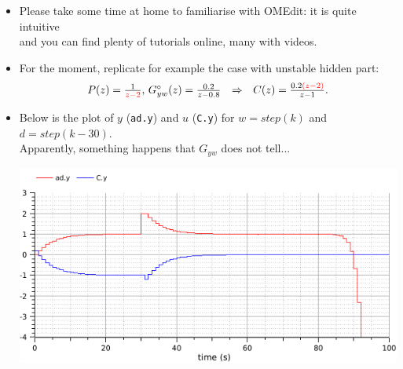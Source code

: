\begin{frame}
\myPause
 \begin{itemize}[<+-| alert@+>]
 \item Please take some time at home to familiarise with OMEdit: it is quite intuitive\\
       and you can find plenty of tutorials online, many with videos. 
 \item For the moment, replicate for example the case with unstable hidden part:
       \begin{displaymath}
        \begin{array}{lcl}
         P(z)              = \frac{1}{\textcolor{red}{z-2}},\,
         G_{yw}^{\circ}(z) = \frac{0.2}{z-0.8} &
         \Rightarrow &
         C(z)              = \frac{0.2\textcolor{red}{(z-2)}}{z-1}.
        \end{array}
       \end{displaymath}
 \item Below is the plot of $y$ (\texttt{ad.y}) and $u$ (\texttt{C.y}) for $w=step(k)$ and $d=step(k-30)$.\\
       Apparently, something happens that $G_{yw}$ does not tell...
       \begin{center}
        \includegraphics[width=0.50\columnwidth]{./Unit-05/img/PS02-ex02-fig04.png}
       \end{center}
 \end{itemize}
\end{frame}

